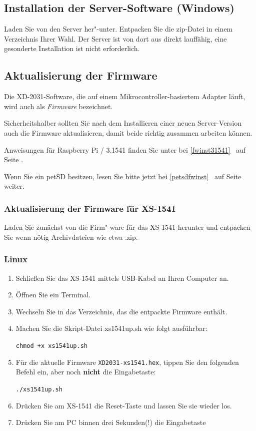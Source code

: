 \documentclass[10pt,a4paper]{scrartcl}		%
\begin{document}
\subsection{Installation der Server-Software (Windows)}
Laden Sie von \winbinaries{} den Server her"-unter. Entpacken Sie die
zip-Datei in einem Verzeichnis Ihrer Wahl. Der Server ist von dort aus
direkt lauffähig, eine gesonderte Installation ist nicht erforderlich.

\subsection{Aktualisierung der Firmware}
Die XD-2031-Software, die auf einem Mikrocontroller-basiertem Adapter
läuft, wird auch als \textit{Firmware} bezeichnet.

Sicherheitshalber sollten Sie nach dem Installieren einer neuen
Server-Version auch die Firmware aktualisieren, damit beide richtig
zusammen arbeiten können.

Anweisungen für Raspberry Pi / 3.1541 finden Sie unter
bei \glqq\ref{fwinst31541} \grqq\ auf Seite
\pageref{fwinst31541}.

Wenn Sie ein petSD besitzen, lesen Sie bitte jetzt bei
\glqq\ref{petsdfwinst} \grqq\ auf Seite
\pageref{petsdfwinst} weiter.

\subsubsection{Aktualisierung der Firmware für XS-1541}
Laden Sie zunächst von \fwbinaries{} die Firm"-ware für das XS-1541
herunter und entpacken Sie wenn nötig Archivdateien wie 
etwa \glqq .zip\grqq . 

\clearpage
\subsubsection*{Linux}
\begin{enumerate}
\item Schließen Sie das XS-1541 mittels USB-Kabel an Ihren Computer an.
\item Öffnen Sie ein Terminal.
\item Wechseln Sie in das Verzeichnis, das die entpackte Firmware enthält.
\item Machen Sie die Skript-Datei xs1541up.sh wie folgt ausführbar:

\texttt{chmod +x xs1541up.sh}
\item Für die aktuelle Firmware \texttt{XD2031-xs1541.hex}, tippen Sie
	den folgenden Befehl ein, aber noch \textbf{nicht} die
	Eingabetaste:

	\texttt{./xs1541up.sh}

\item Drücken Sie am XS-1541 die Reset-Taste und lassen Sie sie wieder los.
\item Drücken Sie am PC binnen drei Sekunden(!) die Eingabetaste
\end{enumerate}
\end{document}

